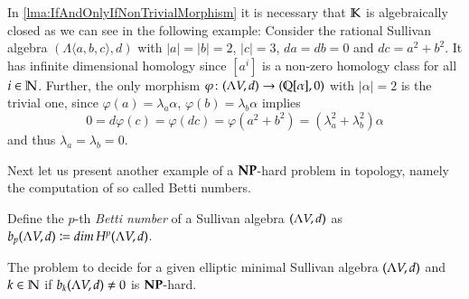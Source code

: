 \begin{Remark}
  In \ref{lma:IfAndOnlyIfNonTrivialMorphism} it is necessary that $\mathbb{K}$ is algebraically closed 
  as we can see in the following example: \newline
  Consider the rational Sullivan algebra $(\Lambda \langle a, b, c \rangle,d)$ with $|a| = |b| = 2$, $|c| = 3$,
  $da = db = 0$ and $dc = a^2 + b^2$. It has infinite dimensional homology since $ [a^i]$ is a non-zero homology
  class for all $i \in \mathbb{N}$. Further, the only morphism $\varphi \colon (\Lambda V,d) \to (\mathbb{Q}[\alpha], 0)$ with $|\alpha| = 2$ is the
  trivial one, since $\varphi (a) = \lambda_a \alpha$, $\varphi (b) = \lambda_b \alpha$ implies 
  $$ 0 = d\varphi (c) = \varphi(dc) = \varphi( a^2 + b^2) = (\lambda_a^2 + \lambda_b^2) \alpha$$ and thus
  $\lambda_a = \lambda_b = 0$.
  
 \end{Remark}
  
 
 Next let us present another example of a $\mathbf{NP}$-hard problem in topology, namely the computation
 of so called Betti numbers.
 
 \begin{Definition}
  Define the $p$-th \emph{Betti number} of a Sullivan algebra $(\Lambda V,d)$ as \newline 
  ${b_p (\Lambda V,d) \coloneqq dim \, H^p (\Lambda V,d)}$.
 \end{Definition}


 \begin{Theorem}
 \label{thm:AlgebrasBettiNumbersLemma}
  The problem to decide for a given elliptic minimal Sullivan algebra $(\Lambda V,d)$ and $k \in \mathbb{N}$ if
  $b_k (\Lambda V,d) \neq 0$ is $\mathbf{NP}$-hard.
 \end{Theorem}

